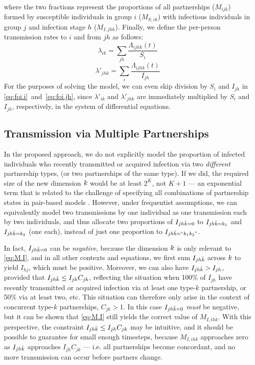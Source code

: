 where the two fractions represent the proportions of all partnerships ($M_{ijk}$)
formed by susceptible individuals in group $i$ ($M_{S,ik}$)
with infectious individuals in group $j$ and infection stage $h$ ($M_{I,jhk}$).
Finally, we define the per-person transmission rates
to $i$ and from $jh$ as follows:
\begin{equation}\label{eq:foi.i}
  \lambda_{ik} = \sum_{jh} \frac{\Lambda_{ijhk}(t)}{S_{i}}
\end{equation}
\begin{equation}\label{eq:foi.jh}
  \lambda'_{jhk} = \sum_{i} \frac{\Lambda_{ijhk}(t)}{I_{jh}}
\end{equation}
For the purposes of solving the model,
we can even skip division by $S_i$ and $I_{jh}$ in \eqref{eq:foi.i}~and~\eqref{eq:foi.jh},
since $\lambda'_{ik}$ and $\lambda'_{jhk}$ are immediately multiplied by $S_i$ and $I_{jh}$,
respectively, in the system of differential equations.
\subsection{Transmission via Multiple Partnerships}\label{prop.mp}
In the proposed approach, we do not explicitly model the proportion of infected individuals
who recently transmitted or acquired infection via two \emph{different} partnership types,
(or two partnerships of the same type).
If we did, the required size of the new dimension $\k$ would be at least $2^{K}$, not $K+1$
--- an exponential term that is related to the challenge of
specifying all combinations of partnership states in pair-based models \cite{Kretzschmar2017}.
However, under frequentist assumptions, we can equivalently model
two transmissions by one individual as one transmission each by two individuals,
and thus allocate two proportions of $I_{jh\k=0}$ to $I_{jh\k=k_1}$ and $I_{jh\k=k_2}$ (one each),
instead of just one proportion to $I_{jh\k={\textnormal{``}k_1k_2\textnormal{''}}}$.
\par
In fact, $I_{jh\k=0}$ can be \emph{negative},
because the dimension $\k$ is only relevant to \eqref{eq:M.I},
and in all other contexts and equations,
we first sum $I_{jh\k}$ across $\k$ to yield $I_{hj}$, which must be positive.
Moreover, we can also have $I_{jh\k} > I_{jh}$, provided that $I_{jh\k} \le I_{jh} C_{jk}$,
reflecting the situation when 100\% of $I_{jh}$
have recently transmitted or acquired infection via at least one type-$k$ partnership,
or 50\% via at least two, etc.
This situation can therefore only arise in the context of
concurrent type-$k$ partnerships, $C_{jk} > 1$.
In this case $I_{jh\k=0}$ \emph{must} be negative,
but it can be shown that \eqref{eq:M.I} still yields the correct value of $M_{I,ihk}$.
With this perspective, the constraint $I_{jh\k} \le I_{jh} C_{jk}$ may be intuitive,
and it should be possible to guarantee for small enough timesteps,
because $M_{I,ihk}$ approaches zero as $I_{jh\k}$ approaches $I_{jh} C_{jk}$
--- i.e. all partnerships become concordant,
and no more transmission can occur before partners change.
